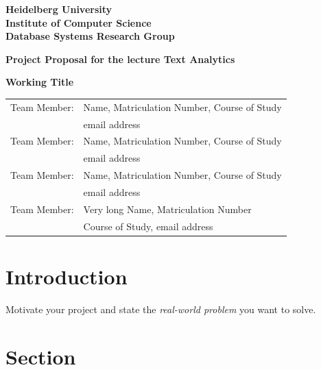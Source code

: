 \documentclass[
     12pt,         %
     a4paper,      %
     BCOR10mm,     %
     DIV14,        %
     ]{article}
\begin{document}
\begin{titlepage}


\vspace*{1cm}
\begin{center}
\vspace*{3cm}
\textbf{ 
\Large Heidelberg University\\
\smallskip
\Large Institute of Computer Science\\
\smallskip
\Large Database Systems Research Group\\
\smallskip
}

\vspace{3cm}

\textbf{\large Project Proposal for the lecture Text Analytics}

\vspace{0.5\baselineskip}
{\huge
\textbf{Working Title}
}
\end{center}

\vfill 

{\large
\begin{tabular}[l]{ll}
Team Member: & Name, Matriculation Number, Course of Study\\
  & email address\\
Team Member: & Name, Matriculation Number, Course of Study\\
  & email address\\
Team Member: & Name, Matriculation Number, Course of Study\\
  & email address\\

Team Member: & Very long Name, Matriculation Number\\
  & Course of Study, email address\\
  
\end{tabular}
}

\end{titlepage}


\section{Introduction}
Motivate your project and state the \textit{real-world problem} you want to solve.



\section{Section}
\end{document}
